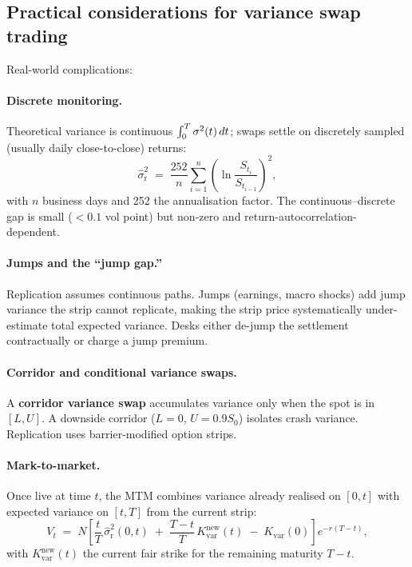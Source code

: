 \subsection{Practical considerations for variance swap trading}
\label{subsec:varswap_practical}

Real-world complications:

\paragraph{Discrete monitoring.}
Theoretical variance is continuous $\int_0^T\sigma^2(t)\,dt$; swaps
settle on discretely sampled (usually daily close-to-close) returns:
\[
  \hat{\sigma}_{\text{r}}^2
  \;=\;
  \frac{252}{n}\sum_{i=1}^{n}
    \left(\ln\frac{S_{t_i}}{S_{t_{i-1}}}\right)^{\!2},
\]
with $n$ business days and 252 the annualisation factor. The
continuous--discrete gap is small ($<0.1$ vol point) but non-zero and
return-autocorrelation-dependent.

\paragraph{Jumps and the ``jump gap.''}
Replication assumes continuous paths. Jumps (earnings, macro shocks)
add jump variance the strip cannot replicate, making the strip price
systematically under-estimate total expected variance. Desks
either de-jump the settlement contractually or charge a jump premium.

\paragraph{Corridor and conditional variance swaps.}
A \textbf{corridor variance swap} accumulates variance only when the
spot is in $[L,U]$. A downside corridor ($L=0$, $U=0.9 S_0$) isolates
crash variance. Replication uses barrier-modified option strips.

\paragraph{Mark-to-market.}
Once live at time $t$, the MTM combines variance already realised on
$[0,t]$ with expected variance on $[t,T]$ from the current strip:
\[
  V_t
  \;=\;
  N\!\left[
    \frac{t}{T}\,\hat\sigma_{\text{r}}^2(0,t)
    \;+\;
    \frac{T - t}{T}\,K_{\text{var}}^{\text{new}}(t)
    \;-\;
    K_{\text{var}}(0)
  \right]
  e^{-r(T-t)},
\]
with $K_{\text{var}}^{\text{new}}(t)$ the current fair strike for the
remaining maturity $T-t$.

